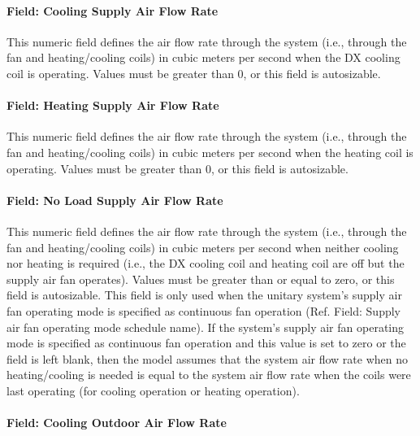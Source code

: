 \paragraph{Field: Cooling Supply Air Flow Rate}\label{field-cooling-supply-air-flow-rate-4-000}

This numeric field defines the air flow rate through the system (i.e., through the fan and heating/cooling coils) in cubic meters per second when the DX cooling coil is operating. Values must be greater than 0, or this field is autosizable.

\paragraph{Field: Heating Supply Air Flow Rate}\label{field-heating-supply-air-flow-rate-6}

This numeric field defines the air flow rate through the system (i.e., through the fan and heating/cooling coils) in cubic meters per second when the heating coil is operating. Values must be greater than 0, or this field is autosizable.

\paragraph{Field: No Load Supply Air Flow Rate}\label{field-no-load-supply-air-flow-rate-5}

This numeric field defines the air flow rate through the system (i.e., through the fan and heating/cooling coils) in cubic meters per second when neither cooling nor heating is required (i.e., the DX cooling coil and heating coil are off but the supply air fan operates). Values must be greater than or equal to zero, or this field is autosizable. This field is only used when the unitary system's supply air fan operating mode is specified as continuous fan operation (Ref. Field: Supply air fan operating mode schedule name). If the system's supply air fan operating mode is specified as continuous fan operation and this value is set to zero or the field is left blank, then the model assumes that the system air flow rate when no heating/cooling is needed is equal to the system air flow rate when the coils were last operating (for cooling operation or heating operation).

\paragraph{Field: Cooling Outdoor Air Flow Rate}\label{field-cooling-outdoor-air-flow-rate-000}

